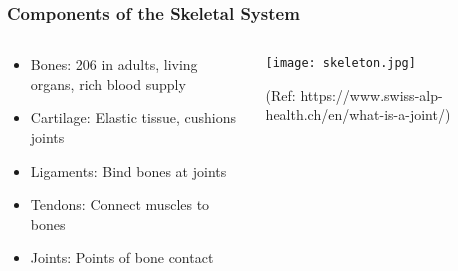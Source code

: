 \begin{frame}[fragile]\frametitle{Components of the Skeletal System}
\begin{columns}
    \begin{column}[T]{0.5\linewidth}
      \begin{itemize}
		\item Bones: 206 in adults, living organs, rich blood supply
		\item Cartilage: Elastic tissue, cushions joints
		\item Ligaments: Bind bones at joints
		\item Tendons: Connect muscles to bones
		\item Joints: Points of bone contact
	  \end{itemize}
    \end{column}
    \begin{column}[T]{0.5\linewidth}
		\begin{center}
		\texttt{[image: skeleton.jpg]} 
		
		{\tiny (Ref: https://www.swiss-alp-health.ch/en/what-is-a-joint/)}
		\end{center}	

    \end{column}
  \end{columns}
\end{frame}



